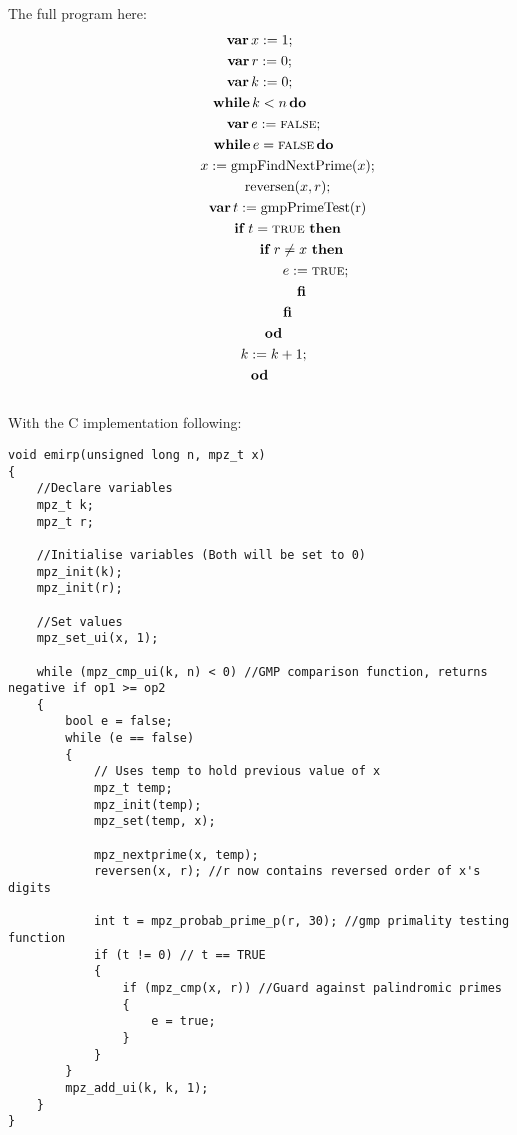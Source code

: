 \documentclass[a4paper,10pt,fleqn]{scrartcl}   	%
\begin{document}
The full program here: 
\begin{gather*}
\text{\normalfont\bfseries var} \, x\mathrel{:=} 1;\\
\text{\normalfont\bfseries var} \, r\mathrel{:=} 0;\\
\text{\normalfont\bfseries var} \, k\mathrel{:=} 0;\\
\text{\normalfont\bfseries while} \, k<n \, \text{\normalfont\bfseries do} \\
\qquad \text{\normalfont\bfseries var} \, e \mathrel{:=} \text{\textsc{false}}; \\
\qquad \text{\normalfont\bfseries while} \, e = \text{\textsc{false}} \, \text{\normalfont\bfseries do} \\
\qquad \qquad  x\mathrel{:=} \text{gmpFindNextPrime($x$)}; \\
\qquad \qquad \text{reversen}(x, r); \\
\qquad \qquad \text{\normalfont\bfseries var} \, t \mathrel{:=} \text{gmpPrimeTest(r)} \\
\qquad \qquad \text{\normalfont\bfseries if} \text{ $t=\text{\textsc{true}}$ } \text{\normalfont\bfseries then} \\
\qquad \qquad \qquad \text{\normalfont\bfseries if} \text{ $r\ne x$ } \text{\normalfont\bfseries then} \\ 
\qquad \qquad \qquad  \qquad e \mathrel{:=} \text{\textsc{true}}; \\
\qquad \qquad \qquad \text{\normalfont\bfseries fi} \\
\qquad \qquad \text{\normalfont\bfseries fi} \\
\qquad \text{\normalfont\bfseries od} \\
\qquad k\mathrel{:=} k+1; \\
\text{\normalfont\bfseries od} 
\end{gather*}\\ 

With the C implementation following: \\
\begin{lstlisting}
void emirp(unsigned long n, mpz_t x)
{
	//Declare variables
	mpz_t k;
	mpz_t r;

	//Initialise variables (Both will be set to 0)
	mpz_init(k);
	mpz_init(r);

	//Set values
	mpz_set_ui(x, 1);

	while (mpz_cmp_ui(k, n) < 0) //GMP comparison function, returns negative if op1 >= op2
	{
		bool e = false;
		while (e == false)
		{
			// Uses temp to hold previous value of x
			mpz_t temp;
			mpz_init(temp);
			mpz_set(temp, x);

			mpz_nextprime(x, temp);
			reversen(x, r); //r now contains reversed order of x's digits

			int t = mpz_probab_prime_p(r, 30); //gmp primality testing function
			if (t != 0) // t == TRUE
			{
				if (mpz_cmp(x, r)) //Guard against palindromic primes
				{
					e = true;
				}
			}
		}
		mpz_add_ui(k, k, 1);
	}
}
\end{lstlisting}
\end{document}
